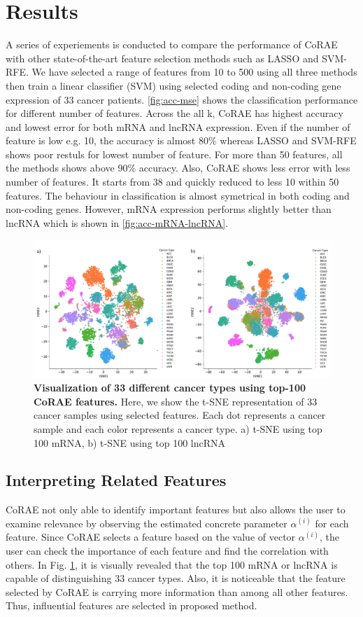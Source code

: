 \documentclass{bioinfo}
\begin{document}
{\section{Results}
A series of experiements is conducted to compare the performance of CoRAE with other state-of-the-art feature selection methods such as LASSO and SVM-RFE. We have selected a range of features from 10 to 500 using all three methods then train a linear classifier (SVM) using selected coding and non-coding gene expression of 33 cancer patients. \ref{fig:acc-mse} shows the classification performance for different number of features. Across the all k, CoRAE has highest accuracy and lowest error for both mRNA and lncRNA expression. Even if the number of feature is low e.g. 10, the accuracy is almost 80\% whereas LASSO and SVM-RFE shows poor restuls for lowest number of feature. For more than 50 features, all the methods shows above 90\% accuracy. Also, CoRAE shows less error with less number of features. It starts from 38 and quickly reduced to less 10 within 50 features. The behaviour in classification is almost symetrical in both coding and non-coding genes. However, mRNA expression performs slightly better than lncRNA which is shown in \ref{fig:acc-mRNA-lncRNA}.
\begin{figure}[h!]
    \centering
    \includegraphics[scale=0.45]{fig/tSNE.pdf}
    \caption{\textbf{Visualization of 33 different cancer types using top-100 CoRAE features.} Here, we show the t-SNE representation of 33 cancer samples using selected features. Each dot represents a cancer sample and each color represents a cancer type. a) t-SNE using top 100 mRNA, b) t-SNE using top 100 lncRNA}
    \label{fig:tsne}
\end{figure}


\subsection{Interpreting Related Features} \label{inter}
CoRAE not only able to identify important features but also allows the user to examine relevance by observing the estimated concrete parameter $\alpha^{(i)}$ for each feature. Since CoRAE selects a feature based on the value of vector $\alpha^{(i)}$, the user can check the importance of each feature and find the correlation with others.  In Fig. \ref{fig:tsne}, it is visually revealed that the top 100 mRNA or lncRNA is capable of distinguishing 33 cancer types. Also, it is noticeable that the feature selected by CoRAE is carrying more information than among all other features. Thus, influential features are selected in proposed method. 
}
\end{document}
